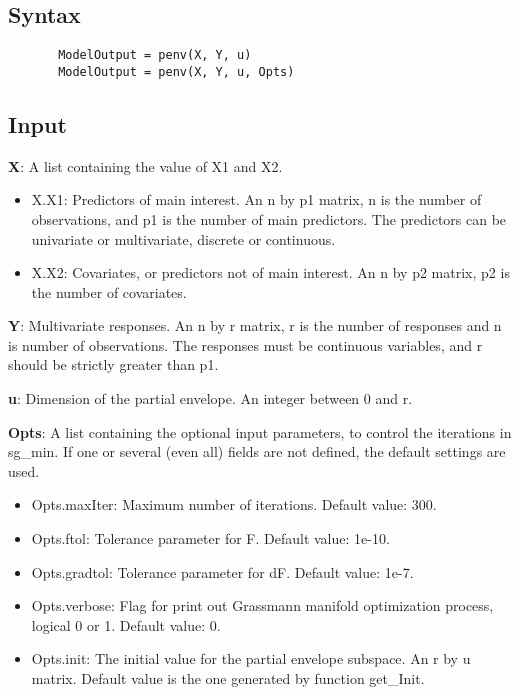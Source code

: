 \documentclass[a4paper,11pt,openany]{memoir}
\begin{document}
\subsection*{Syntax}


\begin{verbatim}       ModelOutput = penv(X, Y, u)
       ModelOutput = penv(X, Y, u, Opts)\end{verbatim}
    

\subsection*{Input}

\begin{par}
\textbf{X}: A list containing the value of X1 and X2.
\end{par} \vspace{1em}
\begin{itemize}
\setlength{\itemsep}{-1ex}
   \item X.X1: Predictors of main interest. An n by p1 matrix, n is the number of observations, and p1 is the number of main predictors. The predictors can be univariate or multivariate, discrete or continuous.
   \item X.X2: Covariates, or predictors not of main interest.  An n by p2 matrix, p2 is the number of covariates.
\end{itemize}
\begin{par}
\textbf{Y}: Multivariate responses. An n by r matrix, r is the number of responses and n is number of observations. The responses must be continuous variables, and r should be strictly greater than p1.
\end{par} \vspace{1em}
\begin{par}
\textbf{u}: Dimension of the partial envelope. An integer between 0 and r.
\end{par} \vspace{1em}
\begin{par}
\textbf{Opts}: A list containing the optional input parameters, to control the iterations in sg\_min. If one or several (even all) fields are not defined, the default settings are used.
\end{par} \vspace{1em}
\begin{itemize}
\setlength{\itemsep}{-1ex}
   \item Opts.maxIter: Maximum number of iterations.  Default value: 300.
   \item Opts.ftol: Tolerance parameter for F.  Default value: 1e-10.
   \item Opts.gradtol: Tolerance parameter for dF.  Default value: 1e-7.
   \item Opts.verbose: Flag for print out Grassmann manifold optimization process, logical 0 or 1. Default value: 0.
   \item Opts.init: The initial value for the partial envelope subspace. An r by u matrix. Default value is the one generated by function get\_Init.
\end{itemize}
\end{document}
